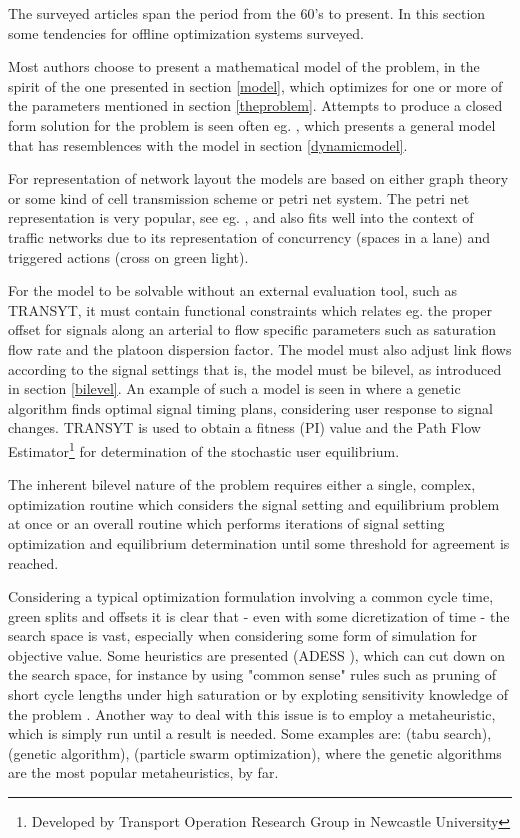 \label{offline}
The surveyed articles span the period from the 60's to present. In this section some tendencies for offline optimization systems surveyed.

Most authors choose to present a mathematical model of the problem, in the spirit of the one presented in section \ref{model}, which optimizes for one or more of the parameters mentioned in section \ref{theproblem}. Attempts to produce a closed form solution for the problem is seen often eg. \cite{36}, which presents a general model that has resemblences with the model in section \ref{dynamicmodel}.

For representation of network layout the models are based on either graph theory or some kind of cell transmission scheme or petri net system. The petri net representation is very popular, see eg. \cite{petri}, and also fits well into the context of traffic networks due to its representation of concurrency (spaces in a lane) and triggered actions (cross on green light).

For the model to be solvable without an external evaluation tool, such as TRANSYT, it must contain functional constraints which relates eg. the proper offset for signals along an arterial to flow specific parameters such as saturation flow rate and the platoon dispersion factor.
The model must also adjust link flows according to the signal settings that is, the model must be bilevel, as introduced in section \ref{bilevel}. An example of such a model is seen in \cite{33} where a genetic algorithm finds optimal signal timing plans, considering user response to signal changes. TRANSYT is used to obtain a fitness (PI) value and the Path Flow Estimator\footnote{Developed by Transport Operation Research Group in Newcastle University} for determination of the stochastic user equilibrium.

The inherent bilevel nature of the problem requires either a single, complex, optimization routine which considers the signal setting and equilibrium problem at once or an overall routine which performs iterations of signal setting optimization and equilibrium determination until some threshold for agreement is reached. 

Considering a typical optimization formulation involving a common cycle time, green splits and offsets it is clear that - even with some dicretization of time - the search space is vast, especially when considering some form of simulation for objective value. Some heuristics are presented (ADESS \cite{26}), which can cut down on the search space, for instance by using "common sense" rules such as pruning of short cycle lengths under high saturation or by exploting sensitivity knowledge of the problem \cite{40}.
Another way to deal with this issue is to employ a metaheuristic, which is simply run until a result is needed. Some examples are: \cite{1} (tabu search), \cite{7} (genetic algorithm), \cite{42} (particle swarm optimization), where the genetic algorithms are the most popular metaheuristics, by far.

